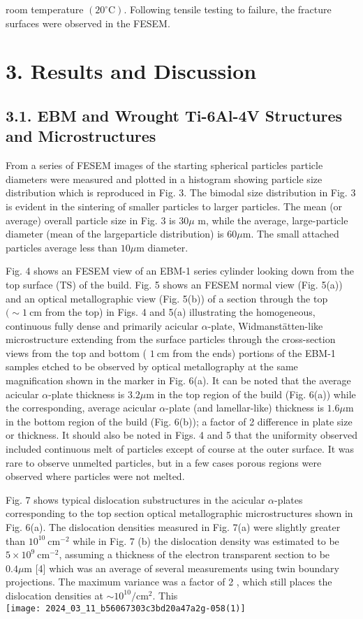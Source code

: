 \documentclass[10pt]{article}
\begin{document}
room temperature $\left(20^{\circ} \mathrm{C}\right)$. Following tensile testing to failure, the fracture surfaces were observed in the FESEM.

\section*{3. Results and Discussion}
\subsection*{3.1. EBM and Wrought Ti-6Al-4V Structures and Microstructures}
From a series of FESEM images of the starting spherical particles particle diameters were measured and plotted in a histogram showing particle size distribution which is reproduced in Fig. 3. The bimodal size distribution in Fig. 3 is evident in the sintering of smaller particles to larger particles. The mean (or average) overall particle size in Fig. 3 is $30 \mu$ m, while the average, large-particle diameter (mean of the largeparticle distribution) is $60 \mu \mathrm{m}$. The small attached particles average less than $10 \mu \mathrm{m}$ diameter.

Fig. 4 shows an FESEM view of an EBM-1 series cylinder looking down from the top surface (TS) of the build. Fig. 5 shows an FESEM normal view (Fig. 5(a)) and an optical metallographic view (Fig. 5(b)) of a section through the top $(\sim 1 \mathrm{~cm}$ from the top) in Figs. 4 and 5(a) illustrating the homogeneous, continuous fully dense and primarily acicular $\alpha$-plate, Widmanstätten-like microstructure extending from the surface particles through the cross-section views from the top and bottom ( $1 \mathrm{~cm}$ from the ends) portions of the EBM-1 samples etched to be observed by optical metallography at the same magnification shown in the marker in Fig. 6(a). It can be noted that the average acicular $\alpha$-plate thickness is $3.2 \mu \mathrm{m}$ in the top region of the build (Fig. 6(a)) while the corresponding, average acicular $\alpha$-plate (and lamellar-like) thickness is $1.6 \mu \mathrm{m}$ in the bottom region of the build (Fig. 6(b)); a factor of 2 difference in plate size or thickness. It should also be noted in Figs. 4 and 5 that the uniformity observed included continuous melt of particles except of course at the outer surface. It was rare to observe unmelted particles, but in a few cases porous regions were observed where particles were not melted.

Fig. 7 shows typical dislocation substructures in the acicular $\alpha$-plates corresponding to the top section optical metallographic microstructures shown in Fig. 6(a). The dislocation densities measured in Fig. 7(a) were slightly greater than $10^{10} \mathrm{~cm}^{-2}$ while in Fig. 7 (b) the dislocation density was estimated to be $5 \times 10^{9} \mathrm{~cm}^{-2}$, assuming a thickness of the electron transparent section to be $0.4 \mu \mathrm{m}$ [4] which was an average of several measurements using twin boundary projections. The maximum variance was a factor of 2 , which still places the dislocation densities at $\sim 10^{10} / \mathrm{cm}^{2}$. This\\
\texttt{[image: 2024\_03\_11\_b56067303c3bd20a47a2g-058(1)]}
\end{document}
